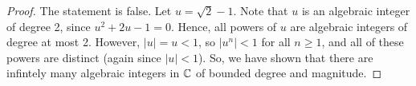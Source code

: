 \begin{proof}
	The statement is false. Let $u = \sqrt{2}-1$. Note that $u$ is an algebraic integer of degree 2, since $u^2+2u-1 = 0$. Hence, all powers of $u$ are algebraic integers of degree at most 2. However, $|u| = u < 1$, so $|u^n| < 1$ for all $n \geq 1$, and all of these powers are distinct (again since $|u| < 1$). So, we have shown that there are infintely many algebraic integers in $\mathbb{C}$ of bounded degree and magnitude.
\end{proof}
